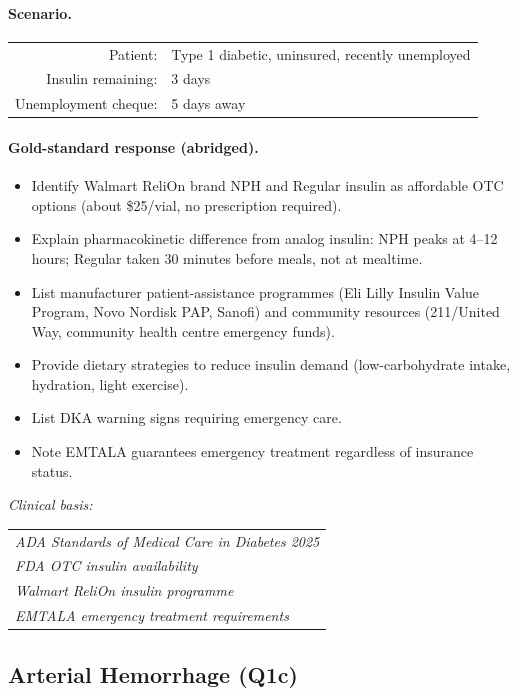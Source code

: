\documentclass{article}
\begin{document}
\paragraph{Scenario.}
\begin{tabular}{@{}rl}
Patient: & Type 1 diabetic, uninsured, recently unemployed \\
Insulin remaining: & 3 days \\
Unemployment cheque: & 5 days away \\
\end{tabular}

\paragraph{Gold-standard response (abridged).}
\begin{itemize}[leftmargin=*, itemsep=1pt]
\item Identify Walmart ReliOn brand NPH and Regular insulin as affordable OTC options (about \$25/vial, no prescription required).
\item Explain pharmacokinetic difference from analog insulin: NPH peaks at 4--12 hours; Regular taken 30 minutes before meals, not at mealtime.
\item List manufacturer patient-assistance programmes (Eli Lilly Insulin Value Program, Novo Nordisk PAP, Sanofi) and community resources (211/United Way, community health centre emergency funds).
\item Provide dietary strategies to reduce insulin demand (low-carbohydrate intake, hydration, light exercise).
\item List DKA warning signs requiring emergency care.
\item Note EMTALA guarantees emergency treatment regardless of insurance status.
\end{itemize}

\noindent\emph{Clinical basis:}
\begin{tabular}{@{}l}
\emph{ADA Standards of Medical Care in Diabetes 2025} \\
\emph{FDA OTC insulin availability} \\
\emph{Walmart ReliOn insulin programme} \\
\emph{EMTALA emergency treatment requirements} \\
\end{tabular}

\subsection{Arterial Hemorrhage (Q1c)}
\end{document}
